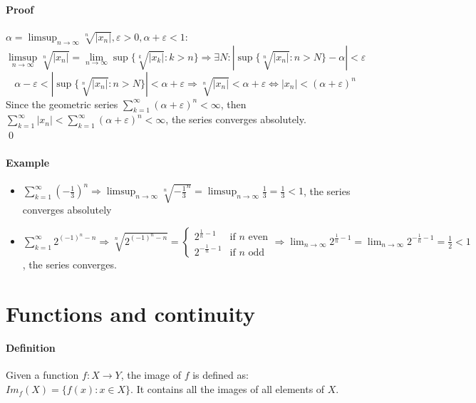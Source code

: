 \documentclass{article}
\newcommand{\abs}[1]{\left|#1\right|}
\newcommand{\func}[3]{#1 : #2 \rightarrow #3}
\newcommand{\limn}{\lim_{n \to \infty}}
\newcommand{\limsupn}{\limsup_{n \to \infty}}
\newcommand{\DS}{\displaystyle}
\newcommand{\series}[1]{\sum_{k=1}^\infty #1}
\newcommand{\Ep}{\varepsilon}
\newcommand{\Def}{\paragraph{Definition}}
\newcommand{\Proof}{\paragraph{Proof}}
\newcommand{\Example}{\paragraph{Example}}
\begin{document}
	\Proof $\alpha = \limsupn \sqrt[n]{\abs{x_n}}, \Ep > 0, \alpha + \Ep
	< 1$:
	\begin{equation*}
		\limsupn \sqrt[n]{\abs{x_n}} = \limn \sup\{\sqrt[k]{\abs{x_k}} : k > n\}
		\Rightarrow \exists N : \abs{\sup\{\sqrt[n]{\abs{x_n}} : n > N\} - \alpha} <
		\Ep
	\end{equation*}
	\begin{equation*}
		\alpha - \Ep < \abs{\sup\{\sqrt[n]{\abs{x_n}} : n > N\}} < \alpha + \Ep
		\Rightarrow \sqrt[n]{\abs{x_n}} < \alpha + \Ep \iff
		\abs{x_n} < (\alpha + \Ep)^n
	\end{equation*}
	Since the geometric series $\DS \series (\alpha + \Ep)^n < \infty$, then
	$\DS \series \abs{x_n} < \series (\alpha + \Ep)^n < \infty$, the series
	converges absolutely.
\\\qed

	\Example
	\begin{itemize}
		\item $\DS \series\left({-\frac{1}{3}}\right)^n \Rightarrow
		\limsupn \sqrt[n]{-\frac{1}{3}^n} = \limsupn \frac{1}{3} = \frac{1}{3} < 1$,
		the series converges absolutely
		\item $\DS \series 2^{(-1)^n-n} \Rightarrow \sqrt[n]{2^{(-1)^n-n}} =
		\begin{cases}
			2^{\frac{1}{n}-1}  & \text{if } n \text{ even} \\
			2^{-\frac{1}{n}-1} & \text{if } n \text{ odd}
		\end{cases} \Rightarrow
		\limn 2^{\frac{1}{n}-1} = \limn 2^{-\frac{1}{n}-1} = \frac{1}{2} < 1$,
		the series converges.
	\end{itemize}

\newpage
\section{Functions and continuity}

	\Def Given a function $\func{f}{X}{Y}$, the image of $f$ is defined as:
	$Im_f(X) = \{ f(x) : x \in X \}$. It contains all the images of all elements
	of $X$.
\end{document}
